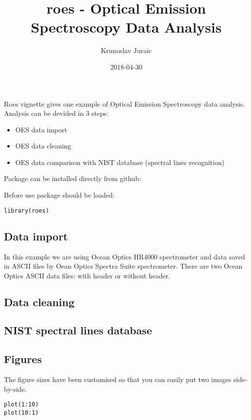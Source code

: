 \documentclass[]{article}
\title{roes - Optical Emission Spectroscopy Data Analysis}
\author{Krunoslav Juraic}
\date{2018-04-30}
\providecommand{\tightlist}{%
  \setlength{\itemsep}{0pt}\setlength{\parskip}{0pt}}
\begin{document}
\maketitle

Roes vignette gives one example of Optical Emission Spectroscopy data
analysis. Analysis can be devided in 3 steps:

\begin{itemize}
\tightlist
\item
  OES data import
\item
  OES data cleaning
\item
  OES data comparison with NIST database (spectral lines recognition)
\end{itemize}

Package can be installed directly from github:

Before use package should be loaded:

\begin{verbatim}
library(roes)
\end{verbatim}

\subsection{Data import}\label{data-import}

In this example we are using Ocean Optics HR4000 spectrometer and data
saved in ASCII files by Oean Optics Spectra Suite spectrometer. There
are two Ocean Optics ASCII data files: with header or without header.

\subsection{Data cleaning}\label{data-cleaning}

\subsection{NIST spectral lines
database}\label{nist-spectral-lines-database}

\subsection{Figures}\label{figures}

The figure sizes have been customised so that you can easily put two
images side-by-side.

\begin{verbatim}
plot(1:10)
plot(10:1)
\end{verbatim}
\end{document}
